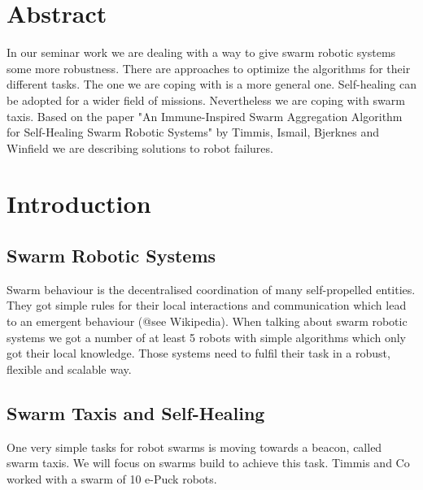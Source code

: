 \documentclass[
	a4paper,
	article,
	pagesize,
	pdftex,
	12pt,
	english,
	fleqn,
	final,
	]{scrartcl}
\begin{document}

\makeTitel

\tableofcontents
\clearpage

\section{Abstract}
In our seminar work we are dealing with a way to give swarm robotic systems some more robustness. There are approaches to optimize the algorithms for their different tasks. The one we are coping with is a more general one. Self-healing can be adopted for a wider field of missions. Nevertheless we are coping with swarm taxis. Based on the paper "An Immune-Inspired Swarm Aggregation Algorithm for Self-Healing Swarm Robotic Systems" by Timmis, Ismail, Bjerknes and Winfield we are describing solutions to robot failures.

\section{Introduction}

\subsection{Swarm Robotic Systems}
Swarm behaviour is the decentralised coordination of many self-propelled entities. They got simple rules for their local interactions and communication which lead to an emergent behaviour (@see Wikipedia). 
When talking about swarm robotic systems we got a number of at least 5 robots with simple algorithms which only got their local knowledge.
Those systems need to fulfil their task in a robust, flexible and scalable way.

\subsection{Swarm Taxis and Self-Healing}
One very simple tasks for robot swarms is moving towards a beacon, called swarm taxis. We will focus on swarms build to achieve this task. Timmis and Co worked with a swarm of 10 e-Puck robots.
\end{document}
